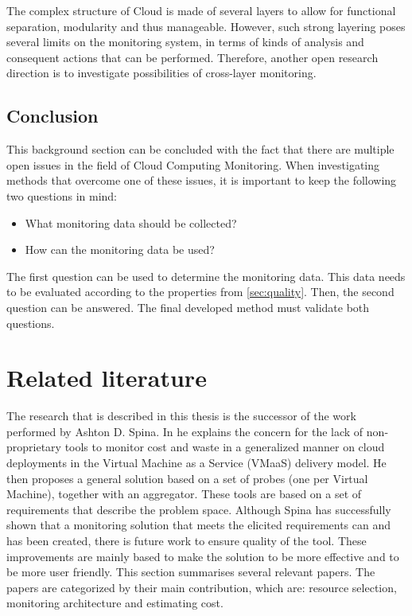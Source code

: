 \noindent
The complex structure of Cloud is made of several layers to allow for functional separation, modularity and thus manageable. However, such strong layering poses several limits on the monitoring system, in terms of kinds of analysis and consequent actions that can be performed. Therefore, another open research direction is to investigate possibilities of cross-layer monitoring.

\subsection{Conclusion}
This background section can be concluded with the fact that there are multiple open issues in the field of Cloud Computing Monitoring. When investigating methods that overcome one of these issues, it is important to keep the following two questions in mind:
\begin{itemize}
    \item What monitoring data should be collected?
    \item How can the monitoring data be used?
\end{itemize} 
The first question can be used to determine the monitoring data. This data needs to be evaluated according to the properties from \autoref{sec:quality}. Then, the second question can be answered. The final developed method must validate both questions.


\section{Related literature} \label{sec:related_literature}
The research that is described in this thesis is the successor of the work performed by Ashton D. Spina. In \cite{spina} he explains the concern for the lack of non-proprietary tools to monitor cost and waste in a generalized manner on cloud deployments in the Virtual Machine as a Service (VMaaS) delivery model. He then proposes a general solution based on a set of probes (one per Virtual Machine), together with an aggregator. These tools are based on a set of requirements that describe the problem space. Although Spina has successfully shown that a monitoring solution that meets the elicited requirements can and has been created, there is future work to ensure quality of the tool. These improvements are mainly based to make the solution to be more effective and to be more user friendly. This section summarises several relevant papers. The papers are categorized by their main contribution, which are: resource selection, monitoring architecture and estimating cost.


